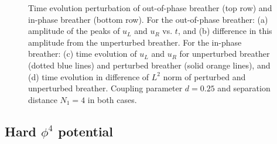 \documentclass[12pt,reqno]{amsart}
\theoremstyle{definition}
\begin{document}
\begin{figure}
\begin{center}
\begin{subfigure}{0.45\linewidth}
		\label{fig:timestepSGd}
	\end{subfigure}
	\end{center}
	\caption{Time evolution perturbation of out-of-phase breather (top row) and in-phase breather (bottom row). For the out-of-phase breather: (a) amplitude of the peaks of $u_L$ and $u_R$ vs. $t$, and (b) difference in this amplitude from the unperturbed breather. For the in-phase breather: (c) time evolution of $u_L$ and $u_R$ for unperturbed breather (dotted blue lines) and perturbed breather (solid orange lines), and (d) time evolution in difference of $L^2$ norm of perturbed and unperturbed breather. Coupling parameter $d=0.25$ and separation distance $N_1 = 4$ in both cases.}
	\label{fig:timestepSG}
\end{figure}

\subsection{Hard \texorpdfstring{$\phi^4$}{phi-4} potential}
\end{document}
